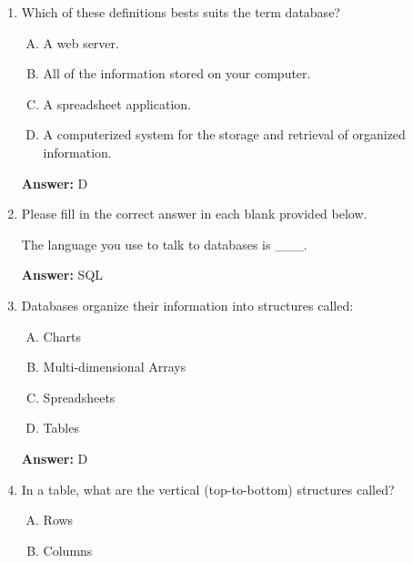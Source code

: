 \documentclass[12pt]{article}
\begin{document}
\begin{enumerate}[1.]
    \item

    Which of these definitions bests suits the term database?

    \bigskip

    \begin{enumerate}[A.]
        \item A web server.
        \item All of the information stored on your computer.
        \item A spreadsheet application.
        \item A computerized system for the storage and retrieval of organized information.
    \end{enumerate}

    \bigskip

    \textbf{Answer:} D

    \item

    Please fill in the correct answer in each blank provided below.

    \bigskip

    The language you use to talk to databases is \_\_\_.

    \bigskip

    \textbf{Answer:} SQL

    \item

    Databases organize their information into structures called:

    \bigskip

    \begin{enumerate}[A.]
        \item Charts
        \item Multi-dimensional Arrays
        \item Spreadsheets
        \item Tables
    \end{enumerate}

    \bigskip

    \textbf{Answer:} D

    \item

    In a table, what are the vertical (top-to-bottom) structures called?

    \bigskip

    \begin{enumerate}[A.]
        \item Rows
        \item Columns
    \end{enumerate}


\end{enumerate}
\end{document}
